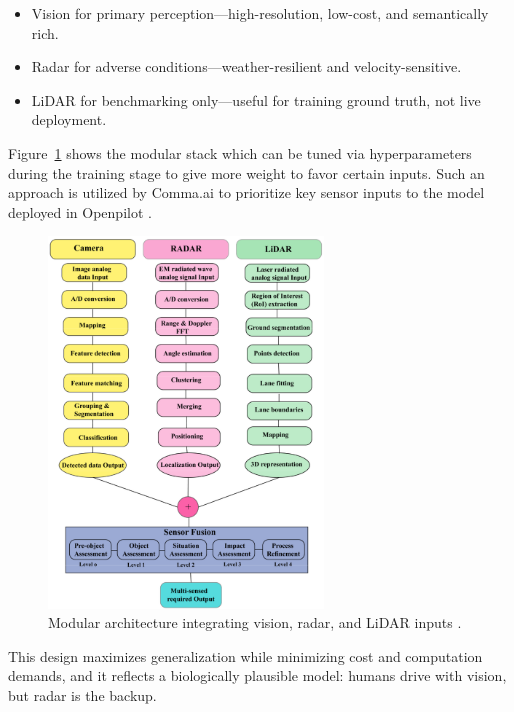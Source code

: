 \documentclass[12pt]{article}
\begin{document}
\begin{itemize}[nosep]
  \item Vision for primary perception—high-resolution, low-cost, and semantically rich.
  \item Radar for adverse conditions—weather-resilient and velocity-sensitive.
  \item LiDAR for benchmarking only—useful for training ground truth, not live deployment.
\end{itemize}
Figure~\ref{fig:multiarch} shows the modular stack which can be tuned via
hyperparameters during the training stage to give more weight to favor certain
inputs. Such an approach is utilized by Comma.ai to prioritize key sensor inputs
to the model deployed in Openpilot \cite{goff2025learningdriveworldmodel}.
\begin{figure}[H]
	\centering
	\includegraphics[width=0.65\textwidth]{multimodelarch}
	\caption{Modular architecture integrating vision, radar, and LiDAR inputs \autocite{Hasanujjaman2023}.}
	\label{fig:multiarch}
\end{figure}

This design maximizes generalization while minimizing cost and computation demands, and it reflects a biologically plausible model: humans drive with vision, but radar is the backup.
\end{document}
